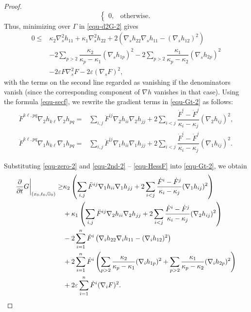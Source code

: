 \documentclass[11pt,reqno]{amsart}
\theoremstyle{remark}
\numberwithin{equation}{section}
\begin{document}
\begin{proof}
\begin{equation*}
\begin{cases}
    		0,& \mbox{otherwise}.
    	\end{cases}
    \end{equation*}
    Thus, minimizing over $\Gamma$ in \eqref{equ-d2G-2} gives
    \begin{align}
    	0 \leq & \kappa_2 \nabla_s^2 h_{11} + \kappa_1 \nabla_s^2 h_{22} + 2 \left( \nabla_s h_{22}\nabla_s h_{11} - (\nabla_s h_{12})^2  \right) \nonumber\\
    	& - 2 \sum\limits_{p>2} \dfrac{\kappa_2}{\kappa_p-\kappa_1}(\nabla_s h_{1p})^2 - 2 \sum\limits_{p>2} \dfrac{\kappa_1}{\kappa_p - \kappa_2} (\nabla_s h_{2p})^2 \nonumber \\
    	& - 2 \varepsilon F \nabla_s^2 F - 2 \varepsilon (\nabla_s F)^2,
    	\label{equ-2nd-2}
    \end{align}
    with the terms on the second line regarded as vanishing if the denominators vanish (since the corresponding component of $\nabla h$ vanishes in that case). Using the formula \eqref{equ-secf}, we rewrite the gradient terms in \eqref{equ-Gt-2} as follows:
    \begin{align}
       \ddot{F}^{k\ell,pq}\nabla_2 h_{k\ell}\nabla_2 h_{pq}= &\sum\limits_{i,j} \ddot{F}^{ij}\nabla_2 h_{ii}\nabla_2 h_{jj} + 2\sum\limits_{i< j} \dfrac{\dot{F}^i -\dot{F}^{j}}{\kappa_i-\kappa_{j}}(\nabla_2 h_{ij})^2, \\
       \ddot{F}^{k\ell,pq}\nabla_1 h_{k\ell}\nabla_1 h_{pq} =&\sum\limits_{i,j} \ddot{F}^{ij}\nabla_1 h_{ii}\nabla_1 h_{jj} + 2\sum\limits_{i< j} \dfrac{\dot{F}^i -\dot{F}^{j}}{\kappa_i-\kappa_{j}} (\nabla_1 h_{ij})^2. \label{equ-HessF}
    \end{align}
    
    Substituting \eqref{equ-zero-2} and \eqref{equ-2nd-2} -- \eqref{equ-HessF} into \eqref{equ-Gt-2}, we obtain
    \begin{align}
    	\dfrac{\partial}{\partial t}G \bigg|_{(x_0,t_0,\mathbb{O}_0)} \geq &  \kappa_2 \left( \sum\limits_{i,j} \ddot{F}^{ij}\nabla_1 h_{ii}\nabla_1 h_{jj} + 2\sum\limits_{i< j} \dfrac{\dot{F}^i -\dot{F}^{j}}{\kappa_i-\kappa_{j}} (\nabla_1 h_{ij})^2 \right) \notag\\
    	& + \kappa_1 \left( \sum\limits_{i,j} \ddot{F}^{ij}\nabla_2 h_{ii}\nabla_2 h_{jj} + 2\sum\limits_{i< j} \dfrac{\dot{F}^i -\dot{F}^{j}}{\kappa_i-\kappa_{j}}(\nabla_2 h_{ij})^2 \right) \notag\\
    	& - 2 \sum\limits_{i=1}^n \dot{F}^i \left( \nabla_i h_{22}\nabla_i h_{11} - (\nabla_i h_{12})^2  \right) \nonumber\\
    	& + 2 \sum\limits_{i=1}^n \dot{F}^i \left( \sum\limits_{p>2} \dfrac{\kappa_2}{\kappa_p-\kappa_1}(\nabla_i h_{1p})^2 + \sum\limits_{p>2} \dfrac{\kappa_1}{\kappa_p-\kappa_2} (\nabla_i h_{2p})^2  \right) \nonumber \\
    	& + 2 \varepsilon \sum\limits_{i=1}^n \dot{F}^i (\nabla_i F)^2. \label{equ-ptg22}
    \end{align}


\end{proof}
\end{document}
